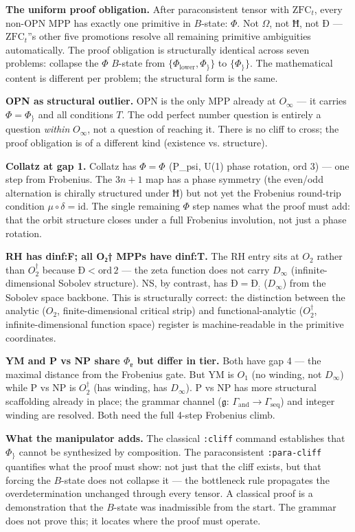 \documentclass[12pt,a4paper]{article}
\begin{document}
\textbf{The uniform proof obligation.} After paraconsistent tensor with $\text{ZFC}_t$, every non-OPN MPP has exactly one primitive in $B$-state: $\Phi$. Not $\Omega$, not $\text{Ħ}$, not $\text{Ð}$ --- $\text{ZFC}_t$''s other five promotions resolve all remaining primitive ambiguities automatically. The proof obligation is structurally identical across seven problems: collapse the $\Phi$ $B$-state from $\{\Phi_\text{lower}, \Phi_\}\}$ to $\{\Phi_\}\}$. The mathematical content is different per problem; the structural form is the same.

\textbf{OPN as structural outlier.} OPN is the only MPP already at $O_{\infty}$ --- it carries $\Phi = \Phi_\}$ and all conditions $T$. The odd perfect number question is entirely a question \emph{within} $O_{\infty}$, not a question of reaching it. There is no cliff to cross; the proof obligation is of a different kind (existence vs. structure).

\textbf{Collatz at gap 1.} Collatz has $\Phi = \Phi_\dot{}$ (P\_psi, U(1) phase rotation, ord 3) --- one step from Frobenius. The $3n+1$ map has a phase symmetry (the even/odd alternation is chirally structured under $\text{Ħ}$) but not yet the Frobenius round-trip condition $\mu \circ \delta = \text{id}$. The single remaining $\Phi$ step names what the proof must add: that the orbit structure closes under a full Frobenius involution, not just a phase rotation.

\textbf{RH has dinf:F; all O₂† MPPs have dinf:T.} The RH entry sits at $O_2$ rather than $O_2^\dagger$ because $\text{Ð} < \text{ord}\, 2$ --- the zeta function does not carry $D_{\infty}$ (infinite-dimensional Sobolev structure). NS, by contrast, has $\text{Ð} = \text{Ð}_;$ ($D_{\infty}$) from the Sobolev space backbone. This is structurally correct: the distinction between the analytic ($O_2$, finite-dimensional critical strip) and functional-analytic ($O_2^\dagger$, infinite-dimensional function space) register is machine-readable in the primitive coordinates.

\textbf{YM and P vs NP share $\Phi_\text{ɐ}$ but differ in tier.} Both have gap 4 --- the maximal distance from the Frobenius gate. But YM is $O_1$ (no winding, not $D_{\infty}$) while P vs NP is $O_2^\dagger$ (has winding, has $D_{\infty}$). P vs NP has more structural scaffolding already in place; the grammar channel ($\mathfrak{g}$: $\Gamma_\text{and} \to \Gamma_\text{seq}$) and integer winding are resolved. Both need the full 4-step Frobenius climb.

\textbf{What the manipulator adds.} The classical \texttt{:cliff} command establishes that $\Phi_\}$ cannot be synthesized by composition. The paraconsistent \texttt{:para-cliff} quantifies what the proof must show: not just that the cliff exists, but that forcing the $B$-state does not collapse it --- the bottleneck rule propagates the overdetermination unchanged through every tensor. A classical proof is a demonstration that the $B$-state was inadmissible from the start. The grammar does not prove this; it locates where the proof must operate.
\end{document}
